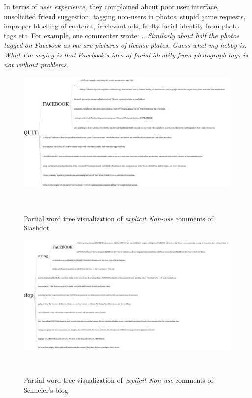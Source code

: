 In terms of \textit{user experience}, they complained about poor user interface, unsolicited friend suggestion, tagging non-users in photos, stupid game requests, improper blocking of contents, irrelevant ads, faulty facial identity from photo tags etc. For example, one commenter wrote: \textit{...Similarly about half the photos tagged on Facebook as me are pictures of license plates. Guess what my hobby is. What I'm saying is that Facebook's idea of facial identity from photograph tags is not without problems.} 

\begin{figure}
  \centering
  \includegraphics[width=1.0\columnwidth]{figures/WT1.JPG}
  \caption{Partial word tree visualization of  \emph{explicit Non-use} comments of Slashdot}~\label{fig:figure1}
\end{figure}

\begin{figure}
  \centering
  \includegraphics[width=1.0\columnwidth]{figures/WT2.JPG}
  \caption{Partial word tree visualization of  \emph{explicit Non-use} comments of Schneier's blog}~\label{fig:figure2}
\end{figure}



